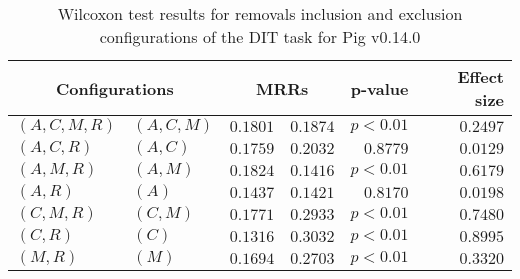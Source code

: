
\begin{table}
\begin{spacing}{1.2}
\centering
\caption{Wilcoxon test results for removals inclusion and exclusion configurations of the DIT task for Pig v0.14.0}
\label{table:versus-wilcox-pig-dit-removals}
\begin{tabular}{ll|rr|rr}
\toprule
      \multicolumn{2}{c|}{Configurations} &          \multicolumn{2}{c|}{MRRs} &       p-value & Effect size \\
\midrule
 $(A,C,M,R)$ &  $(A,C,M)$ & $0.1801$ & $0.1874$ & $p<0.01$ &    $0.2497$ \\
   $(A,C,R)$ &    $(A,C)$ & $0.1759$ & $0.2032$ & $0.8779$ &    $0.0129$ \\
   $(A,M,R)$ &    $(A,M)$ & $0.1824$ & $0.1416$ & $p<0.01$ &    $0.6179$ \\
     $(A,R)$ &      $(A)$ & $0.1437$ & $0.1421$ & $0.8170$ &    $0.0198$ \\
   $(C,M,R)$ &    $(C,M)$ & $0.1771$ & $0.2933$ & $p<0.01$ &    $0.7480$ \\
     $(C,R)$ &      $(C)$ & $0.1316$ & $0.3032$ & $p<0.01$ &    $0.8995$ \\
     $(M,R)$ &      $(M)$ & $0.1694$ & $0.2703$ & $p<0.01$ &    $0.3320$ \\
\bottomrule
\end{tabular}

\end{spacing}
\end{table}


